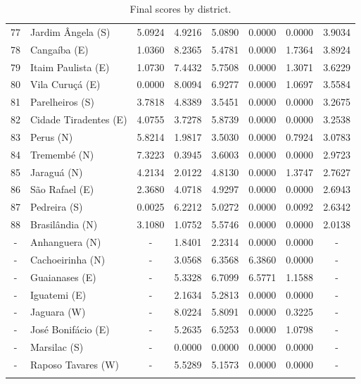\documentclass[12pt]{article}
\begin{document}
\begin{longtable}[c]{c|lccccc|c}
77  & Jardim Ângela      (S) & 5.0924   & 4.9216   & 5.0890   & 0.0000   & 0.0000   & 3.9034  \\
78  & Cangaíba           (E) & 1.0360   & 8.2365   & 5.4781   & 0.0000   & 1.7364   & 3.8924  \\
79  & Itaim Paulista     (E) & 1.0730   & 7.4432   & 5.7508   & 0.0000   & 1.3071   & 3.6229  \\
80  & Vila Curuçá        (E) & 0.0000   & 8.0094   & 6.9277   & 0.0000   & 1.0697   & 3.5584  \\
81  & Parelheiros        (S) & 3.7818   & 4.8389   & 3.5451   & 0.0000   & 0.0000   & 3.2675  \\
82  & Cidade Tiradentes  (E) & 4.0755   & 3.7278   & 5.8739   & 0.0000   & 0.0000   & 3.2538  \\
83  & Perus              (N) & 5.8214   & 1.9817   & 3.5030   & 0.0000   & 0.7924   & 3.0783  \\
84  & Tremembé           (N) & 7.3223   & 0.3945   & 3.6003   & 0.0000   & 0.0000   & 2.9723  \\
85  & Jaraguá            (N) & 4.2134   & 2.0122   & 4.8130   & 0.0000   & 1.3747   & 2.7627  \\
86  & São Rafael         (E) & 2.3680   & 4.0718   & 4.9297   & 0.0000   & 0.0000   & 2.6943  \\
87  & Pedreira           (S) & 0.0025   & 6.2212   & 5.0272   & 0.0000   & 0.0092   & 2.6342  \\
88  & Brasilândia        (N) & 3.1080   & 1.0752   & 5.5746   & 0.0000   & 0.0000   & 2.0138  \\
-   & Anhanguera         (N) & -        & 1.8401   & 2.2314   & 0.0000   & 0.0000   & -       \\
-   & Cachoeirinha       (N) & -        & 3.0568   & 6.3568   & 6.3860   & 0.0000   & -       \\
-   & Guaianases         (E) & -        & 5.3328   & 6.7099   & 6.5771   & 1.1588   & -       \\
-   & Iguatemi           (E) & -        & 2.1634   & 5.2813   & 0.0000   & 0.0000   & -       \\
-   & Jaguara            (W) & -        & 8.0224   & 5.8091   & 0.0000   & 0.3225   & -       \\
-   & José Bonifácio     (E) & -        & 5.2635   & 6.5253   & 0.0000   & 1.0798   & -       \\
-   & Marsilac           (S) & -        & 0.0000   & 0.0000   & 0.0000   & 0.0000   & -       \\
-   & Raposo Tavares     (W) & -        & 5.5289   & 5.1573   & 0.0000   & 0.0000   & -       \\

\caption{Final scores by district.}
\label{tab:results}
\end{longtable}
\normalsize
\end{document}

